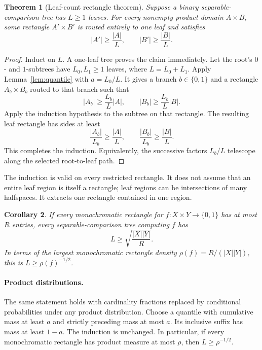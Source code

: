 \documentclass[11pt]{article}
\newtheorem{theorem}{Theorem}[section]
\newtheorem{corollary}[theorem]{Corollary}
\theoremstyle{definition}
\newcommand{\bits}{\{0,1\}}
\begin{document}
\begin{theorem}[Leaf-count rectangle theorem]\label{thm:leaf}
Suppose a binary separable-comparison tree has \(L\ge1\) leaves. For every nonempty product domain \(A\times B\), some rectangle \(A'\times B'\) is routed entirely to one leaf and satisfies
\[
 |A'|\ge\frac{|A|}{L},\qquad |B'|\ge\frac{|B|}{L}.       \tag{2}
\]
\end{theorem}
\begin{proof}
Induct on \(L\). A one-leaf tree proves the claim immediately.
Let the root's \(0\)- and \(1\)-subtrees have \(L_0,L_1\ge1\) leaves, where \(L=L_0+L_1\).
Apply Lemma~\ref{lem:quantile} with \(a=L_0/L\).
It gives a branch \(b\in\{0,1\}\) and a rectangle \(A_b\times B_b\) routed to that branch such that
\[
 |A_b|\ge\frac{L_b}{L}|A|,\qquad
 |B_b|\ge\frac{L_b}{L}|B|.
\]
Apply the induction hypothesis to the subtree on that rectangle. The resulting leaf rectangle has sides at least
\[
 \frac{|A_b|}{L_b}\ge\frac{|A|}{L},
 \qquad
 \frac{|B_b|}{L_b}\ge\frac{|B|}{L}.
\]
This completes the induction. Equivalently, the successive factors \(L_b/L\) telescope along the selected root-to-leaf path.
\end{proof}

The induction is valid on every restricted rectangle. It does not assume that an entire leaf region is itself a rectangle; leaf regions can be intersections of many halfspaces. It extracts one rectangle contained in one region.

\begin{corollary}\label{cor:leafarea}
If every monochromatic rectangle for \(f:X\times Y\to\bits\) has at most \(R\) entries, every separable-comparison tree computing \(f\) has
\[
 L\ge\sqrt{\frac{|X||Y|}{R}}.
\]
In terms of the largest monochromatic rectangle density \(\rho(f)=R/(|X||Y|)\), this is \(L\ge\rho(f)^{-1/2}\).
\end{corollary}

\paragraph{Product distributions.}
The same statement holds with cardinality fractions replaced by conditional probabilities under any product distribution. Choose a quantile with cumulative mass at least \(a\) and strictly preceding mass at most \(a\). Its inclusive suffix has mass at least \(1-a\). The induction is unchanged. In particular, if every monochromatic rectangle has product measure at most \(\rho\), then \(L\ge\rho^{-1/2}\).
\end{document}
